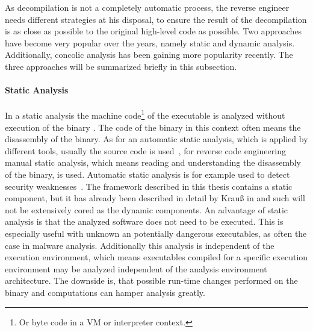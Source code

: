 \documentclass[10pt,twoside,a4paper,bibliography=totoc]{scrbook}
\begin{document}
As decompilation is not a completely automatic process, the reverse engineer needs different strategies at his disposal, to ensure the result of the decompilation is as close as possible to the original high-level code as possible. 
Two approaches have become very popular over the years, namely static and dynamic analysis. Additionally, concolic analysis has been gaining more popularity recently. The three approaches will be summarized briefly in this subsection.

\paragraph*{Static Analysis}
In a static analysis the machine code\footnote{Or byte code in a VM or interpreter context.} of the executable is analyzed without execution of the binary \cite{staticdyn}. 
The code of the binary in this context often means the disassembly of the binary. 
As for an automatic static analysis, which is applied by different tools, 
usually the source code is used~\cite{dynsurvey}, for reverse code engineering manual static analysis, which means reading and understanding the disassembly of the binary, is used.
Automatic static analysis is for example used to detect security weaknesses~\cite{autstatic}.
The framework described in this thesis contains a static component, but it has already been described in detail by Krau\ss{} in \cite{Krau:Thesis2016} and such will not be extensively cored as the dynamic components.
An advantage of static analysis is that the analyzed software does not need to be executed.
This is especially useful with unknown an potentially dangerous executables, as often the case in malware analysis.
Additionally this analysis is independent of the execution environment, which means executables compiled for a specific execution environment may be analyzed independent of the analysis environment architecture. 
The downside is, that possible run-time changes performed on the binary and computations can hamper analysis greatly. 
\end{document}
